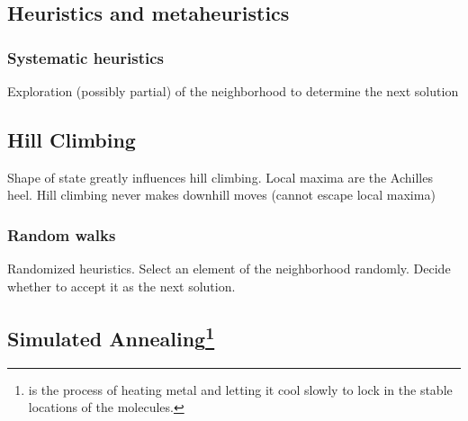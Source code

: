\subsection{Heuristics and metaheuristics}

\begin{Parallel}[v]{0.48\textwidth}{0.46\textwidth}
\ParallelPar
\end{Parallel}

\subsubsection{Systematic heuristics}
Exploration (possibly partial) of the neighborhood to determine the next solution

\subsection{Hill Climbing}
Shape of state greatly influences hill climbing. Local maxima are the Achilles heel. Hill climbing never makes downhill moves (cannot escape local maxima)

\subsubsection{Random walks}
Randomized heuristics. Select an element of the neighborhood randomly. Decide whether to accept it as the next solution.

\subsection[Simulated Annealing]{Simulated Annealing\footnote{ is the process of heating metal and letting it cool slowly to lock in the stable locations of the molecules.}}

